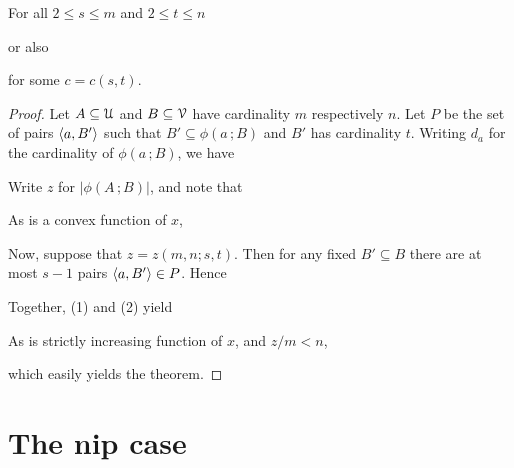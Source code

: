 \documentclass[scombinatorics.tex]{subfiles}
\begin{document}
\begin{void_thm}\label{thm_KST}
  For all $2\le s\le m$ and $2\le t\le n$
  \smallskip


  or also

  
  for some $c = c(s,t)$.

  
\end{void_thm}
\begin{proof}
  Let $A\subseteq\EuScript U$ and $B\subseteq\EuScript V$ have cardinality $m$ respectively $n$.
  Let $P$ be the set of pairs $\langle a,B'\rangle$ such that $B'\subseteq\phi(a\,;B)$ and $B'$ has cardinality $t$.
  Writing $d_a$ for the cardinality of $\phi(a\,;B)$, we have


  Write $z$ for $|\phi(A\,;B)|$, and note that


  As  is a convex function of $x$,
  \smallskip

  \smallskip

  Now, suppose that $z=z(m, n; s, t)$.
  Then for any fixed $B'\subseteq B$ there are at most $s-1$ pairs $\langle a,B'\rangle\in P$. 
  Hence


  Together, (1) and (2) yield
  \smallskip

  \smallskip

  As  is strictly increasing function of $x$, and $z/m<n$,
  \smallskip

  \medskip

  which easily yields the theorem.
\end{proof}


\section{The {\sc nip} case}
\end{document}
